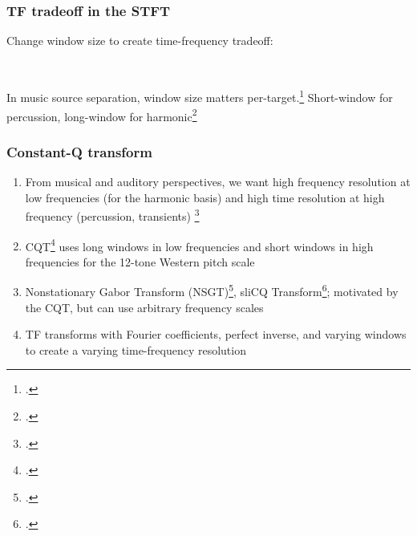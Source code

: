 \documentclass[usenames,dvipsnames]{beamer}
\begin{document}
\begin{frame}
	\frametitle{TF tradeoff in the STFT}
	Change window size to create time-frequency tradeoff:
	\begin{figure}[ht]
		\centering
		\vspace{-1.25em}
		\hspace{0.5em}
		\\
		\vspace{-0.75em}
		\vspace{-0.25em}
	\end{figure}
	In music source separation, window size matters per-target.\footcite{tftradeoff1} Short-window for percussion, long-window for harmonic\footcite{driedger}
\end{frame}

\begin{frame}
	\frametitle{Constant-Q transform}
	\begin{enumerate}
	\item
		From musical and auditory perspectives, we want high frequency resolution at low frequencies (for the harmonic basis) and high time resolution at high frequency (percussion, transients) \footcite{cqtransient, doerflerphd}
	\item
		CQT\footcite{jbrown, klapuricqt} uses long windows in low frequencies and short windows in high frequencies for the 12-tone Western pitch scale
	\item
		Nonstationary Gabor Transform (NSGT)\footcite{balazs}, sliCQ Transform\footcite{slicq}; motivated by the CQT, but can use arbitrary frequency scales
	\item
		TF transforms with Fourier coefficients, perfect inverse, and varying windows to create a varying time-frequency resolution
	\end{enumerate}
\end{frame}
\end{document}
